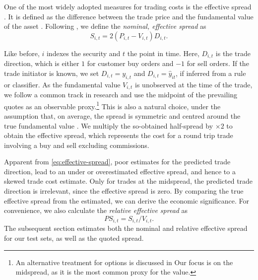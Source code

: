 One of the most widely adopted measures for trading costs is the effective spread \autocite[][112]{Piwowar_2006}. It is defined as the difference between the trade price and the fundamental value of the asset \autocite[][238--239]{bessembinderIssuesAssessingTrade2003}. Following \textcite[][238--239]{bessembinderIssuesAssessingTrade2003}, we define the \emph{nominal, effective spread} as
\begin{equation}
    S_{i,t} = 2 (P_{i,t} - V_{i,t}) D_{i,t}.
    \label{eq:effective-spread}
\end{equation}

Like before, $i$ indexes the security and $t$ the point in time. Here, $D_{i,t}$ is the trade direction, which is either $1$ for customer buy orders and $-1$ for sell orders. If the trade initiator is known, we set $D_{i,t} = y_{i,t}$ and $D_{i,t}=\hat{y}_{it}$, if inferred from a rule or classifier. As the fundamental value $V_{i,t}$ is unobserved at the time of the trade, we follow a common track in research and use the midpoint of the prevailing quotes as an observable proxy.\footnote{An alternative treatment for options is discussed in \textcite[][4975--4976]{muravyevOptionsTradingCosts2020} Our focus is on the midspread, as it is the most common proxy for the value.} This is also a natural choice, under the assumption that, on average, the spread is symmetric and centred around the true fundamental value \autocite[][1018]{leeMarketIntegrationPrice1993}. We multiply the so-obtained half-spread by $\times 2$ to obtain the effective spread, which represents the cost for a round trip trade involving a buy and sell excluding commissions.

Apparent from \cref{eq:effective-spread}, poor estimates for the predicted trade direction, lead to an under or overestimated effective spread, and hence to a skewed trade cost estimate. Only for trades at the midspread, the predicted trade direction is irrelevant, since the effective spread is zero. By comparing the true effective spread from the estimated, we can derive the economic significance. For convenience, we also calculate the \emph{relative effective spread} as
\begin{equation}
    {PS}_{i,t} = S_{i,t} / V_{i,t}.
\end{equation}
The subsequent section estimates both the nominal and relative effective spread for our test sets, as well as the quoted spread.


